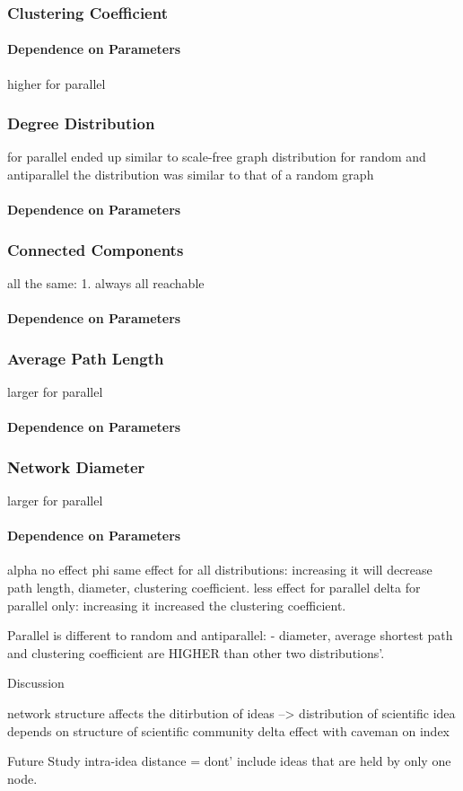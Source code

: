 \subsubsection{Clustering Coefficient}
\paragraph{Dependence on Parameters}


	higher for parallel
\subsubsection{Degree Distribution}
	for parallel ended up similar to scale-free graph distribution
	for random and antiparallel the distribution was similar to that of a random graph
\paragraph{Dependence on Parameters}

\subsubsection{Connected Components}
	all the same: 1. always all reachable
\paragraph{Dependence on Parameters}

\subsubsection{Average Path Length}
	larger for parallel
\paragraph{Dependence on Parameters}

\subsubsection{Network Diameter}
	larger for parallel
\paragraph{Dependence on Parameters}



alpha
	no effect
phi
	same effect for all distributions: increasing it will decrease path length, diameter, clustering coefficient. less effect for parallel
delta
	for parallel only: increasing it increased the clustering coefficient.

Parallel is different to random and antiparallel: 
- diameter, average shortest path and clustering coefficient are HIGHER than other two distributions'.





Discussion

network structure affects the ditirbution of ideas --> distribution of scientific idea depends on structure of scientific community
delta effect with caveman on index


Future Study
intra-idea distance = dont' include ideas that are held by only one node.